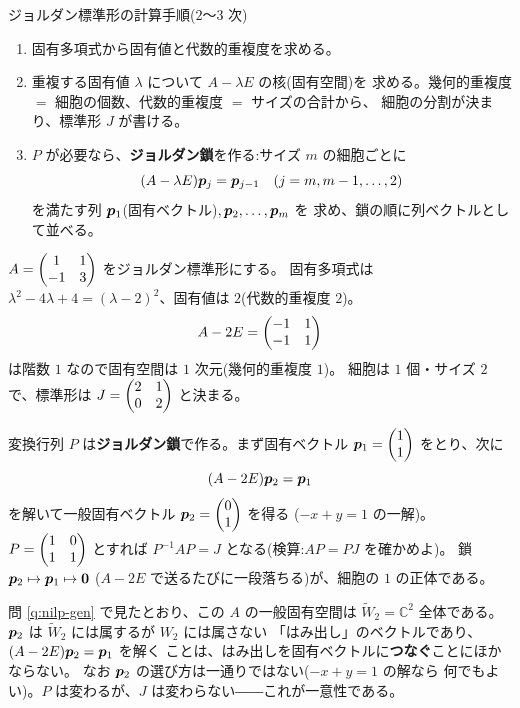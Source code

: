 \begin{itembox}[l]{ジョルダン標準形の計算手順($2$〜$3$ 次)}
\begin{enumerate}
\item 固有多項式から固有値と代数的重複度を求める。
\item 重複する固有値 $\lambda$ について $A - \lambda E$ の核(固有空間)を
求める。幾何的重複度 $=$ 細胞の個数、代数的重複度 $=$ サイズの合計から、
細胞の分割が決まり、標準形 $J$ が書ける。
\item $P$ が必要なら、\textbf{ジョルダン鎖}を作る:サイズ $m$ の細胞ごとに
\[
(A - \lambda E)\bm{p}_j = \bm{p}_{j-1} \quad (j = m, m-1, \dots, 2)
\]
を満たす列 $\bm{p}_1$(固有ベクトル)$, \bm{p}_2, \dots, \bm{p}_m$ を
求め、鎖の順に列ベクトルとして並べる。
\end{enumerate}
\end{itembox}

\begin{rei}[$2$ 次の場合]\label{rei:jordan-2x2}
$A = \begin{pmatrix}1 & 1 \\ -1 & 3\end{pmatrix}$ をジョルダン標準形にする。
固有多項式は $\lambda^2 - 4\lambda + 4 = (\lambda - 2)^2$、固有値は
$2$(代数的重複度 $2$)。
\[
A - 2E = \begin{pmatrix}-1 & 1 \\ -1 & 1\end{pmatrix}
\]
は階数 $1$ なので固有空間は $1$ 次元(幾何的重複度 $1$)。
細胞は $1$ 個・サイズ $2$ で、標準形は $J = \begin{pmatrix}2 & 1 \\ 0 & 2\end{pmatrix}$ と決まる。

変換行列 $P$ は\textbf{ジョルダン鎖}で作る。まず固有ベクトル
$\bm{p}_1 = \begin{pmatrix}1 \\ 1\end{pmatrix}$ をとり、次に
\[
(A - 2E)\bm{p}_2 = \bm{p}_1
\]
を解いて一般固有ベクトル $\bm{p}_2 = \begin{pmatrix}0 \\ 1\end{pmatrix}$ を得る
($-x + y = 1$ の一解)。$P = \begin{pmatrix}1 & 0 \\ 1 & 1\end{pmatrix}$ とすれば
$P^{-1}AP = J$ となる(検算:$AP = PJ$ を確かめよ)。
鎖 $\bm{p}_2 \mapsto \bm{p}_1 \mapsto \bm{0}$
($A - 2E$ で送るたびに一段落ちる)が、細胞の $1$ の正体である。
\end{rei}

\begin{chui}
問 \ref{q:nilp-gen} で見たとおり、この $A$ の一般固有空間は
$\widetilde{W}_2 = \mathbb{C}^2$ 全体である。$\bm{p}_2$ は
$\widetilde{W}_2$ には属するが $W_2$ には属さない
「はみ出し」のベクトルであり、$(A - 2E)\bm{p}_2 = \bm{p}_1$ を解く
ことは、はみ出しを固有ベクトルに\textbf{つなぐ}ことにほかならない。
なお $\bm{p}_2$ の選び方は一通りではない($-x + y = 1$ の解なら
何でもよい)。$P$ は変わるが、$J$ は変わらない――これが一意性である。
\end{chui}

